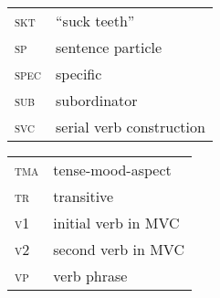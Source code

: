 \newpage 
\begin{tabularx}{.45\textwidth}{lQ}
\textsc{skt} & “suck teeth”\\
\textsc{sp} & sentence particle\\
\textsc{spec} & specific\\
\textsc{sub} & subordinator\\
\textsc{svc} & serial verb construction\\
\end{tabularx}
\begin{tabularx}{.45\textwidth}{lQ}
\textsc{tma} & tense-mood-aspect\\
\textsc{tr} & transitive\\
\textsc{v1} & initial verb in MVC\\
\textsc{v2} & second verb in MVC\\
\textsc{vp} & verb phrase\\
\end{tabularx}